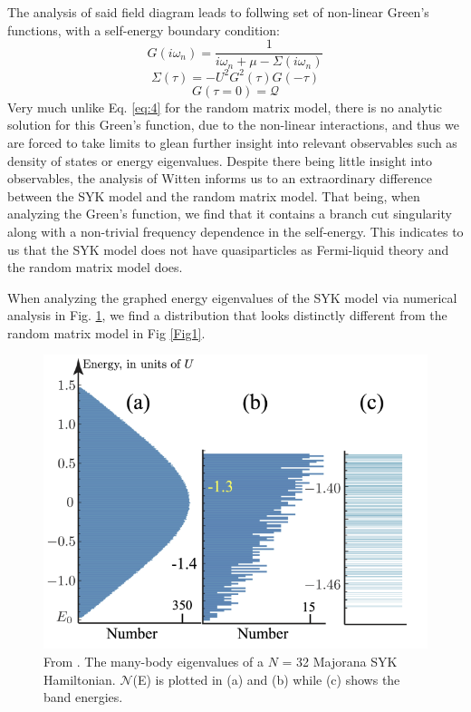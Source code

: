 \documentclass[reprint]{revtex4-2}
\begin{document}
The analysis of said field diagram leads to follwing set of non-linear Green's functions, with a self-energy boundary condition:
\begin{equation}
    G(i\omega_{n}) = \frac{1}{i\omega_{n} + \mu - \Sigma(i\omega_{n})}
\end{equation}
\begin{equation}
    \Sigma(\tau)= -U^{2}G^{2}(\tau)G(-\tau)
\end{equation}
\begin{equation}
    G(\tau = 0) = \mathcal{Q}
\end{equation}
Very much unlike Eq. \ref{eq:4} for the random matrix model, there is no analytic solution for this Green's function, due to the non-linear interactions, and thus we are forced to take limits to glean further insight into relevant observables such as density of states or energy eigenvalues. Despite there being little insight into observables, the analysis of Witten \cite{Witten:2016iux} informs us to an extraordinary difference between the SYK model and the random matrix model. That being, when analyzing the Green's function, we find that it contains a branch cut singularity along with a non-trivial frequency dependence in the self-energy. This indicates to us that the SYK model does not have quasiparticles as Fermi-liquid theory and the random matrix model does.
\par  When analyzing the graphed energy eigenvalues of the SYK model via numerical analysis in Fig. \ref{fig:3}, we find a distribution that looks distinctly different from the random matrix model in Fig \ref{Fig1}.
\begin{figure}
    \centering
    \includegraphics[scale = 0.6]{SYK Spectrum.png}
    \caption{From \cite{Chowdhury_2022}. The many-body eigenvalues of a $N$ = 32 Majorana SYK Hamiltonian. $\mathcal{N}$(E) is plotted in (a) and (b) while (c) shows the band energies.}
    \label{fig:3}
\end{figure}
\end{document}
